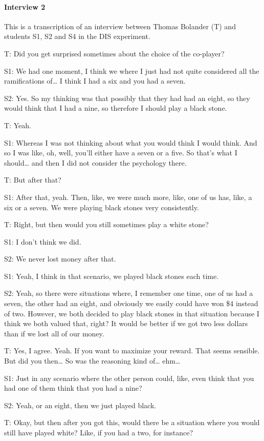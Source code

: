 \bigskip
\paragraph{Interview 2}
This is a transcription of an interview between Thomas Bolander (T) and students S1, S2 and S4 in the DIS experiment.

\medskip
T: Did you get surprised sometimes about the choice of the co-player? 

S1: We had one moment, I think we where I just had not quite considered all the ramifications of… I think I had a six and you had a seven. 

S2: Yes. So my thinking was that possibly that they had had an eight, so they would think that I had a nine, so therefore I should play a black stone.

T: Yeah. 

S1: Whereas I was not thinking about what you would think I would think. And so I was like, oh, well, you'll either have a seven or a five. So that's what I should… and then I did not consider the psychology there.

T: But after that?

S1: After that, yeah. Then, like, we were much more, like, one of us has, like, a six or a seven. We were playing black stones very consistently. 

T: Right, but then would you still sometimes play a white stone? 

S1: I don't think we did.

S2: We never lost money after that. 

S1: Yeah, I think in that scenario, we played black stones each time.

S2: Yeah, so there were situations where, I remember one time, one of us had a seven, the other had an eight, and obviously we easily could have won \$4 instead of two. However, we both decided to play black stones in that situation because I think we both valued that, right? It would be better if we got two less dollars than if we lost all of our money. 

T: Yes, I agree. Yeah. If you want to maximize your reward. That seems sensible. But did you then… So was the reasoning kind of… ehm… 

S1: Just in any scenario where the other person could, like, even think that you had one of them think that you had a nine? 

S2: Yeah, or an eight, then we just played black. 

T: Okay, but then after you got this, would there be a situation where you would still have played white? Like, if you had a two, for instance? 

